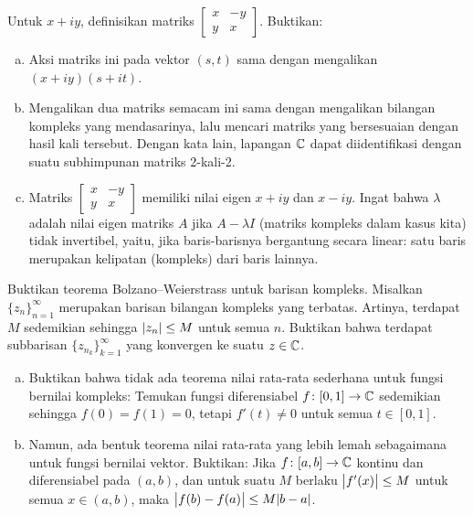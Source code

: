 \begin{samepage}
\begin{exercise}
Untuk $x +iy$, definisikan matriks
$\left[ \begin{smallmatrix} x & -y \\ y & x \end{smallmatrix} \right]$.
Buktikan:
\begin{enumerate}[a)]
\item
Aksi matriks ini pada vektor $(s,t)$ sama dengan mengalikan
$(x+iy)(s+it)$.
\item
Mengalikan dua matriks semacam ini sama dengan mengalikan bilangan kompleks
yang mendasarinya, lalu mencari matriks yang bersesuaian dengan hasil kali tersebut.
Dengan kata lain, lapangan ${\mathbb{C}}$ dapat diidentifikasi dengan suatu subhimpunan matriks 2-kali-2.
\item
Matriks
$\left[ \begin{smallmatrix} x & -y \\ y & x \end{smallmatrix} \right]$
memiliki nilai eigen $x+iy$ dan $x-iy$. Ingat bahwa $\lambda$ adalah
nilai eigen matriks $A$ jika $A-\lambda I$ (matriks kompleks dalam kasus kita)
tidak invertibel, yaitu,
jika baris-barisnya bergantung secara linear: satu baris merupakan kelipatan
(kompleks) dari baris lainnya.
\end{enumerate}
\end{exercise}
\end{samepage}

\begin{exercise}
Buktikan teorema Bolzano--Weierstrass untuk barisan kompleks.
Misalkan $\{ z_n \}_{n=1}^\infty$ merupakan barisan bilangan kompleks yang terbatas.
Artinya, terdapat $M$ sedemikian sehingga $\lvert {z_n} \rvert \leq M$ untuk semua $n$.
Buktikan bahwa terdapat subbarisan $\{ z_{n_k} \}_{k=1}^\infty$
yang konvergen ke suatu $z \in {\mathbb{C}}$.
\end{exercise}

\begin{exercise}
\leavevmode
\begin{enumerate}[a)]
\item
Buktikan bahwa tidak ada teorema nilai rata-rata sederhana untuk fungsi bernilai kompleks:
Temukan fungsi diferensiabel $f \colon [0,1] \to {\mathbb{C}}$ sedemikian sehingga
$f(0) = f(1) = 0$, tetapi $f'(t) \neq 0$ untuk semua $t \in [0,1]$.
\item
Namun, ada bentuk teorema nilai rata-rata yang lebih lemah sebagaimana untuk fungsi bernilai vektor.
Buktikan: Jika $f \colon [a,b] \to {\mathbb{C}}$ kontinu dan diferensiabel pada
$(a,b)$, dan untuk suatu $M$ berlaku $\bigl\lvert {f'(x)} \bigr\rvert \leq M$ untuk semua $x \in (a,b)$, maka
$\bigl\lvert {f(b)-f(a)} \bigr\rvert \leq M \lvert {b-a} \rvert$.
\end{enumerate}
\end{exercise}

